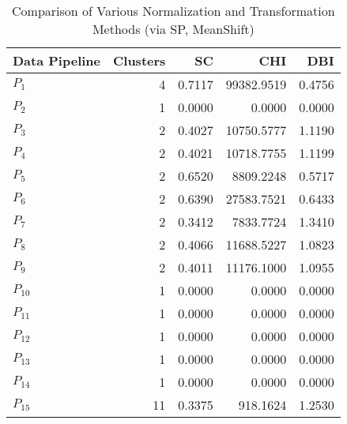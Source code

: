 \begin{table}[t]
\centering
\caption{Comparison of Various Normalization and Transformation Methods (via SP, MeanShift)}
\label{tbl:Comparison_SP_MeanShift_norm_tran}
\begin{tabular}{lrrrr}
\toprule
Data Pipeline &  Clusters &     SC &        CHI &    DBI \\
\midrule
      $P_{1}$ &         4 & 0.7117 & 99382.9519 & 0.4756 \\
      $P_{2}$ &         1 & 0.0000 &     0.0000 & 0.0000 \\
      $P_{3}$ &         2 & 0.4027 & 10750.5777 & 1.1190 \\
      $P_{4}$ &         2 & 0.4021 & 10718.7755 & 1.1199 \\
      $P_{5}$ &         2 & 0.6520 &  8809.2248 & 0.5717 \\
      $P_{6}$ &         2 & 0.6390 & 27583.7521 & 0.6433 \\
      $P_{7}$ &         2 & 0.3412 &  7833.7724 & 1.3410 \\
      $P_{8}$ &         2 & 0.4066 & 11688.5227 & 1.0823 \\
      $P_{9}$ &         2 & 0.4011 & 11176.1000 & 1.0955 \\
     $P_{10}$ &         1 & 0.0000 &     0.0000 & 0.0000 \\
     $P_{11}$ &         1 & 0.0000 &     0.0000 & 0.0000 \\
     $P_{12}$ &         1 & 0.0000 &     0.0000 & 0.0000 \\
     $P_{13}$ &         1 & 0.0000 &     0.0000 & 0.0000 \\
     $P_{14}$ &         1 & 0.0000 &     0.0000 & 0.0000 \\
     $P_{15}$ &        11 & 0.3375 &   918.1624 & 1.2530 \\
\bottomrule
\end{tabular}
\end{table}
